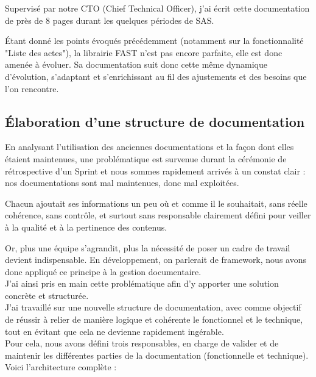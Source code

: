 \documentclass{article}
\begin{document}
Supervisé par notre CTO (Chief Technical Officer), j'ai écrit cette documentation de près de 8 pages durant les quelques périodes de SAS.

Étant donné les points évoqués précédemment (notamment sur la fonctionnalité "Liste des actes"), la librairie FAST n'est pas encore parfaite, elle est donc amenée à évoluer. Sa documentation suit donc cette même dynamique d'évolution, s'adaptant et s'enrichissant au fil des ajustements et des besoins que l'on rencontre.

\subsection{ Élaboration d'une structure de documentation}

En analysant l'utilisation des anciennes documentations et la façon dont elles étaient maintenues, une problématique est survenue durant la cérémonie de rétrospective d'un Sprint et nous sommes rapidement arrivés à un constat clair : nos documentations sont mal maintenues, donc mal exploitées.

Chacun ajoutait ses informations un peu où et comme il le souhaitait, sans réelle cohérence, sans contrôle, et surtout sans responsable clairement défini pour veiller à la qualité et à la pertinence des contenus.

Or, plus une équipe s'agrandit, plus la nécessité de poser un cadre de travail devient indispensable. En développement, on parlerait de framework, nous avons donc appliqué ce principe à la gestion documentaire.\\

J'ai ainsi pris en main cette problématique afin d'y apporter une solution concrète et structurée.\\
J'ai travaillé sur une nouvelle structure de documentation, avec comme objectif de réussir à relier de manière logique et cohérente le fonctionnel et le technique, tout en évitant que cela ne devienne rapidement ingérable. \\

Pour cela, nous avons défini trois responsables, en charge de valider et de maintenir les différentes parties de la documentation (fonctionnelle et technique). \\

Voici l'architecture complète :
\end{document}
